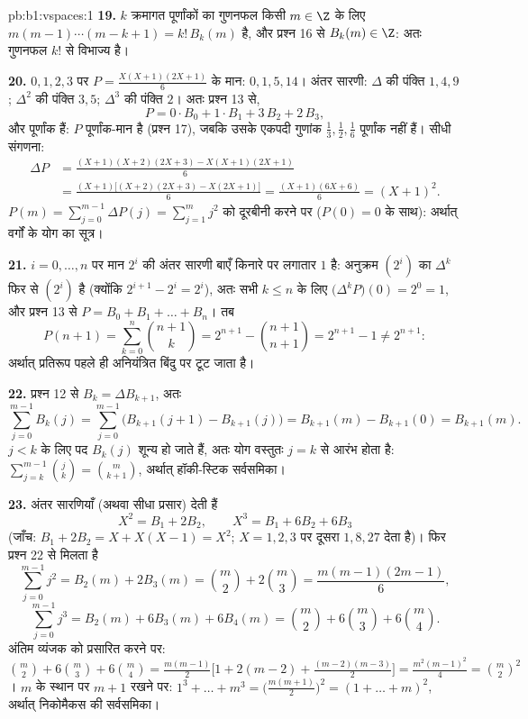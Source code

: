 \begin{solution}{pb:b1:vspaces:1}
\textbf{19.} $k$ क्रमागत पूर्णांकों का गुणनफल किसी $m \in \Z$ के लिए $m(m-1)
\cdots(m-k+1) = k!\,B_k(m)$ है, और प्रश्न 16 से $B_k(m) \in \Z$: अतः गुणनफल
$k!$ से विभाज्य है।

\textbf{20.} $0,1,2,3$ पर $P = \frac{X(X+1)(2X+1)}{6}$ के मान: $0, 1, 5,
14$। अंतर सारणी: $\Delta$ की पंक्ति $1, 4, 9$; $\Delta^2$ की पंक्ति $3, 5$;
$\Delta^3$ की पंक्ति $2$। अतः प्रश्न 13 से,
\[
P = 0\cdot B_0 + 1\cdot B_1 + 3\,B_2 + 2\,B_3 ,
\]
और  पूर्णांक हैं: $P$ पूर्णांक-मान है (प्रश्न 17), जबकि उसके एकपदी
गुणांक $\frac13, \frac12, \frac16$ पूर्णांक नहीं हैं। सीधी संगणना:
\begin{align*}
\Delta P &= \frac{(X+1)(X+2)(2X+3) - X(X+1)(2X+1)}{6} \\
&= \frac{(X+1)\bigl[(X+2)(2X+3) - X(2X+1)\bigr]}{6}
= \frac{(X+1)(6X+6)}{6} = (X+1)^2 .
\end{align*}
$P(m) = \sum_{j=0}^{m-1}\Delta P(j) = \sum_{j=1}^{m} j^2$ को दूरबीनी करने पर
($P(0) = 0$ के साथ): अर्थात् वर्गों के योग का सूत्र।

\textbf{21.} $i = 0, \dots, n$ पर मान $2^i$ की अंतर सारणी बाएँ किनारे पर
लगातार $1$ है: अनुक्रम $(2^i)$ का $\Delta^k$ फिर से $(2^i)$ है (क्योंकि
$2^{i+1} - 2^i = 2^i$), अतः सभी $k \leq n$ के लिए $\bigl(\Delta^k P\bigr)(0)
= 2^0 = 1$, और प्रश्न 13 से $P = B_0 + B_1 + \dots + B_n$। तब
\[
P(n+1) = \sum_{k=0}^{n}\binom{n+1}{k}
= 2^{n+1} - \binom{n+1}{n+1} = 2^{n+1} - 1 \neq 2^{n+1}:
\]
अर्थात् प्रतिरूप पहले ही अनियंत्रित बिंदु पर टूट जाता है।

\textbf{22.} प्रश्न 12 से $B_k = \Delta B_{k+1}$, अतः
\[
\sum_{j=0}^{m-1} B_k(j)
= \sum_{j=0}^{m-1}\bigl(B_{k+1}(j+1) - B_{k+1}(j)\bigr)
= B_{k+1}(m) - B_{k+1}(0) = B_{k+1}(m).
\]
$j < k$ के लिए पद $B_k(j)$ शून्य हो जाते हैं, अतः योग वस्तुतः $j = k$ से
आरंभ होता है: $\sum_{j=k}^{m-1}\binom jk = \binom m{k+1}$, अर्थात्
हॉकी-स्टिक सर्वसमिका।

\textbf{23.} अंतर सारणियाँ (अथवा सीधा प्रसार) देती हैं
\[
X^2 = B_1 + 2 B_2, \qquad X^3 = B_1 + 6 B_2 + 6 B_3
\]
(जाँच: $B_1 + 2B_2 = X + X(X-1) = X^2$; $X = 1, 2, 3$ पर दूसरा $1, 8, 27$
देता है)। फिर प्रश्न 22 से मिलता है
\[
\sum_{j=0}^{m-1} j^2 = B_2(m) + 2B_3(m)
= \binom m2 + 2\binom m3 = \frac{m(m-1)(2m-1)}{6},
\]
\[
\sum_{j=0}^{m-1} j^3 = B_2(m) + 6B_3(m) + 6B_4(m)
= \binom m2 + 6\binom m3 + 6\binom m4 .
\]
अंतिम व्यंजक को प्रसारित करने पर: $\binom m2 + 6\binom m3 + 6\binom m4 =
\frac{m(m-1)}{2}\bigl[1 + 2(m-2) + \frac{(m-2)(m-3)}{2}\bigr] =
\frac{m^2(m-1)^2}{4} = \binom m2^2$। $m$ के स्थान पर $m + 1$ रखने पर: $1^3 +
\dots + m^3 = \bigl(\frac{m(m+1)}2\bigr)^2 = (1 + \dots + m)^2$, अर्थात्
निकोमैकस की सर्वसमिका।


\end{solution}
